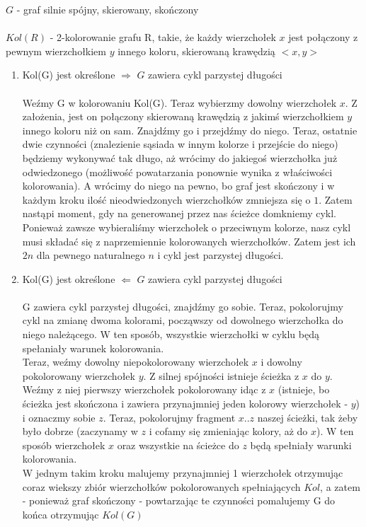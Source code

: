 \documentclass[a4paper,11pt]{article}
\begin{document}
\noindent $G$ - graf silnie spójny, skierowany, skończony \\ \\
$Kol(R)$ - 2-kolorowanie grafu R, takie, że każdy wierzchołek $x$ jest połączony z pewnym wierzchołkiem $y$ innego koloru, skierowaną krawędzią $<x, y>$

\begin{enumerate}
\item{ Kol(G) jest określone $\Rightarrow$ $G$ zawiera cykl parzystej długości\\ \\
Weźmy G w kolorowaniu Kol(G). Teraz wybierzmy dowolny wierzchołek $x$. Z założenia, jest on połączony skierowaną krawędzią z jakimś wierzchołkiem $y$ innego koloru niż on sam. Znajdźmy go i przejdźmy do niego. Teraz, ostatnie dwie czynności (znalezienie sąsiada w innym kolorze i przejście do niego) będziemy wykonywać tak długo, aż wrócimy do jakiegoś wierzchołka już odwiedzonego (możliwość powatarzania ponownie wynika z właściwości kolorowania). A wrócimy do niego na pewno, bo graf jest skończony i w każdym kroku ilość nieodwiedzonych wierzchołków zmniejsza się o $1$. Zatem nastąpi moment, gdy na generowanej przez nas ścieżce domkniemy cykl.\\
Ponieważ zawsze wybieraliśmy wierzchołek o przeciwnym kolorze, nasz cykl musi składać się z naprzemiennie kolorowanych wierzchołków. Zatem jest ich $2n$ dla pewnego naturalnego $n$ i cykl jest parzystej długości.}
\item{ Kol(G) jest określone $\Leftarrow$ $G$ zawiera cykl parzystej długości \\ \\
G zawiera cykl parzystej długości, znajdźmy go sobie. Teraz, pokolorujmy cykl na zmianę dwoma kolorami, począwszy od dowolnego wierzchołka do niego należącego. W ten sposób, wszystkie wierzchołki w cyklu będą spełaniały warunek kolorowania. \\
Teraz, weźmy dowolny niepokolorowany wierzchołek $x$ i dowolny pokolorowany wierzchołek $y$. Z silnej spójności istnieje ścieżka z $x$ do $y$. Weźmy z niej pierwszy wierzchołek pokolorowany idąc z $x$ (istnieje, bo ścieżka jest skończona i zawiera przynajmniej jeden kolorowy wierzchołek - $y$) i oznaczmy sobie $z$. Teraz, pokolorujmy fragment $x .. z$ naszej ścieżki, tak żeby było dobrze (zaczynamy w $z$ i cofamy się zmieniając kolory, aż do $x$). W ten sposób wierzchołek $x$ oraz wszystkie na ścieżce do $z$ będą spełniały warunki kolorowania.\\
W jednym takim kroku malujemy przynajmniej 1 wierzchołek otrzymując coraz wiekszy zbiór wierzchołków pokolorowanych spełniających $Kol$, a zatem - ponieważ graf skończony - powtarzając te czynności pomalujemy G do końca otrzymując $Kol(G)$ }
\end{enumerate}
\end{document}
